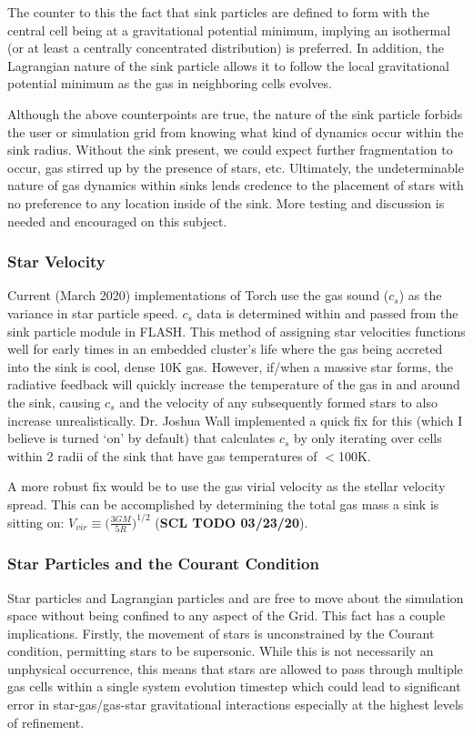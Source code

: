 \documentclass[10pt]{article}
\begin{document}
The counter to this the fact that sink particles are defined to form with the central cell being at a gravitational potential minimum, implying an isothermal (or at least a centrally concentrated distribution) is preferred. In addition, the Lagrangian nature of the sink particle allows it to follow the local gravitational potential minimum as the gas in neighboring cells evolves.

Although the above counterpoints are true, the nature of the sink particle forbids the user or simulation grid from knowing what kind of dynamics occur within the sink radius. Without the sink present, we could expect further fragmentation to occur, gas stirred up by the presence of stars, etc. Ultimately, the undeterminable nature of gas dynamics within sinks lends credence to the placement of stars with no preference to any location inside of the sink. More testing and discussion is needed and encouraged on this subject.

\subsubsection{Star Velocity}
Current (March 2020) implementations of Torch use the gas sound ($c_{s}$) as the variance in star particle speed. $c_{s}$ data is determined within and passed from the sink particle module in FLASH. This method of assigning star velocities functions well for early times in an embedded cluster's life where the gas being accreted into the sink is cool, dense 10K gas. However, if/when a massive star forms, the radiative feedback will quickly increase the temperature of the gas in and around the sink, causing $c_{s}$ and the velocity of any subsequently formed stars to also increase unrealistically. Dr. Joshua Wall implemented a quick fix for this (which I believe is turned `on' by default) that calculates $c_{s}$ by only iterating over cells within 2 radii of the sink that have gas temperatures of $<$100K.

A more robust fix would be to use the gas virial velocity as the stellar velocity spread. This can be accomplished by determining the total gas mass a sink is sitting on: $V_{vir} \equiv \big(\frac{3GM}{5R}\big)^{1/2}$ (\textbf{SCL TODO 03/23/20}).

\subsubsection{Star Particles and the Courant Condition}
Star particles and Lagrangian particles and are free to move about the simulation space without being confined to any aspect of the Grid. This fact has a couple implications. Firstly, the movement of stars is unconstrained by the Courant condition, permitting stars to be supersonic. While this is not necessarily an unphysical occurrence, this means that stars are allowed to pass through multiple gas cells within a single system evolution timestep which could lead to significant error in star-gas/gas-star gravitational interactions especially at the highest levels of refinement.
\end{document}
